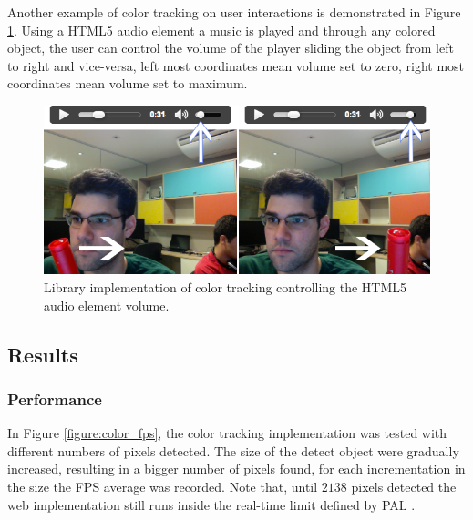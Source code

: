 Another example of color tracking on user interactions is demonstrated in Figure \ref{figure:color_volume}. Using a HTML5 audio element \cite{International2009} a music is played and through any colored object, the user can control the volume of the player sliding the object from left to right and vice-versa, left most coordinates mean volume set to zero, right most coordinates mean volume set to maximum.

\begin{figure}[!htb]
  \centering
  \includegraphics[width=\linewidth]{chapters/evaluation/color_volume.png}
  \caption{Library implementation of color tracking controlling the HTML5 audio element volume.}
  \label{figure:color_volume}
\end{figure}


\subsection{Results} %
\label{sub:evaluation:color_tracking_algorithm:results}

\subsubsection{Performance} %
\label{subsub:evaluation:color_tracking_algorithm:results:performance}

In Figure \ref{figure:color_fps}, the color tracking implementation was tested with different numbers of pixels detected. The size of the detect object were gradually increased, resulting in a bigger number of pixels found, for each incrementation in the size the FPS average was recorded. Note that, until $2138$ pixels detected the web implementation still runs inside the real-time limit defined by PAL \cite{PAL1962}.

